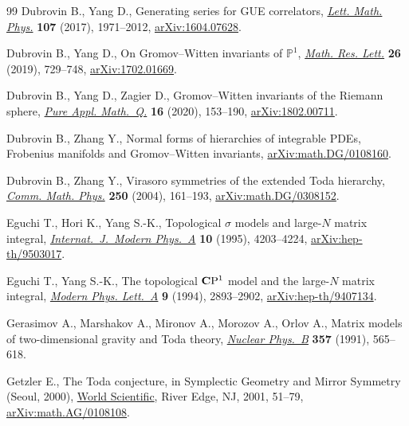 \documentclass[pdftex]{sigma}
\numberwithin{equation}{section}
\begin{document}
\begin{thebibliography}{99}
Dubrovin B., Yang D., Generating series for {GUE} correlators,
 \href{https://doi.org/10.1007/s11005-017-0975-6}{\textit{Lett. Math. Phys.}}
 \textbf{107} (2017), 1971--2012,
 \href{http://arxiv.org/abs/1604.07628}{arXiv:1604.07628}.

Dubrovin B., Yang D., On {G}romov--{W}itten invariants of {$\mathbb{P}^1$},
 \href{https://doi.org/10.4310/MRL.2019.v26.n3.a4}{\textit{Math. Res. Lett.}}
 \textbf{26} (2019), 729--748,
 \href{http://arxiv.org/abs/1702.01669}{arXiv:1702.01669}.

Dubrovin B., Yang D., Zagier D., {G}romov--{W}itten invariants of the {R}iemann
 sphere, \href{https://doi.org/10.4310/pamq.2020.v16.n1.a4}{\textit{Pure Appl.
 Math.~Q.}} \textbf{16} (2020), 153--190,
 \href{http://arxiv.org/abs/1802.00711}{arXiv:1802.00711}.

Dubrovin B., Zhang Y., Normal forms of hierarchies of integrable {PDE}s,
 {F}robenius manifolds and {G}romov--{W}itten invariants,
 \href{http://arxiv.org/abs/math.DG/0108160}{arXiv:math.DG/0108160}.

Dubrovin B., Zhang Y., Virasoro symmetries of the extended {T}oda hierarchy,
 \href{https://doi.org/10.1007/s00220-004-1084-9}{\textit{Comm. Math. Phys.}}
 \textbf{250} (2004), 161--193,
 \href{http://arxiv.org/abs/math.DG/0308152}{arXiv:math.DG/0308152}.

Eguchi T., Hori K., Yang S.-K., Topological {$\sigma$} models and large-{$N$}
 matrix integral,
 \href{https://doi.org/10.1142/S0217751X95001959}{\textit{Internat.~J.~Modern
 Phys.~A}} \textbf{10} (1995), 4203--4224,
 \href{http://arxiv.org/abs/hep-th/9503017}{arXiv:hep-th/9503017}.

Eguchi T., Yang S.-K., The topological {${\bf C}{\rm P}^1$} model and the
 large-{$N$} matrix integral,
 \href{https://doi.org/10.1142/S0217732394002732}{\textit{Modern Phys.
 Lett.~A}} \textbf{9} (1994), 2893--2902,
 \href{http://arxiv.org/abs/hep-th/9407134}{arXiv:hep-th/9407134}.


Gerasimov A., Marshakov A., Mironov A., Morozov A., Orlov A., Matrix models of
 two-dimensional gravity and {T}oda theory,
 \href{https://doi.org/10.1016/0550-3213(91)90482-D}{\textit{Nuclear Phys.~B}}
 \textbf{357} (1991), 565--618.

Getzler E., The {T}oda conjecture, in Symplectic Geometry and Mirror Symmetry
 ({S}eoul, 2000), \href{https://doi.org/10.1142/9789812799821_0003}{World
 Scientific}, River Edge, NJ, 2001, 51--79,
 \href{http://arxiv.org/abs/math.AG/0108108}{arXiv:math.AG/0108108}.


\end{thebibliography}
\end{document}
